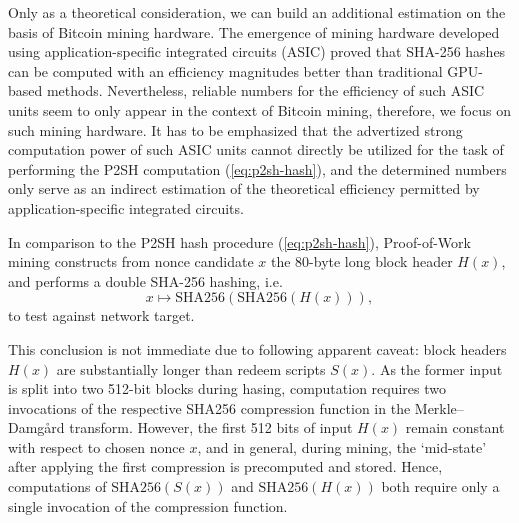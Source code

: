 \documentclass[10pt,a4paper,twocolumn]{article}
\begin{document}


Only as a theoretical consideration, we can build an additional estimation on the basis of Bitcoin mining hardware.
The emergence of mining hardware developed using application-specific integrated circuits (ASIC) proved that SHA-256 hashes can be computed with an efficiency magnitudes better than traditional GPU-based methods.
Nevertheless, reliable numbers for the efficiency of such ASIC units seem to only appear in the context of Bitcoin mining, therefore, we focus on such mining hardware.
It has to be emphasized that the advertized strong computation power of such ASIC units cannot directly be utilized for the task of performing the P2SH computation (\ref{eq:p2sh-hash}), and the determined numbers only serve as an indirect estimation of the theoretical efficiency permitted by application-specific integrated circuits.

In comparison to the P2SH hash procedure (\ref{eq:p2sh-hash}), Proof-of-Work mining constructs from nonce candidate $x$ the 80-byte long block header $H(x)$, and performs a double SHA-256 hashing, i.e. 
\begin{equation}
    x \mapsto \text{{SHA256}}(\text{{SHA256}}(H(x))),\label{eq:pow-hash}
\end{equation}
to test against network target.


This conclusion is not immediate due to following apparent caveat: block headers $H(x)$ are substantially longer than redeem scripts $S(x)$.
As the former input is split into two 512-bit blocks during hasing, computation requires two invocations of the respective {SHA256} compression function in the Merkle–Damgård transform.
However, the first 512 bits of input $H(x)$ remain constant with respect to chosen nonce $x$, and in general, during mining, the \enquote*{mid-state} after applying the first compression is precomputed and stored.
Hence, computations of $\text{{SHA256}}(S(x))$ and $\text{{SHA256}}(H(x))$ both require only a single invocation of the compression function.

\end{document}
